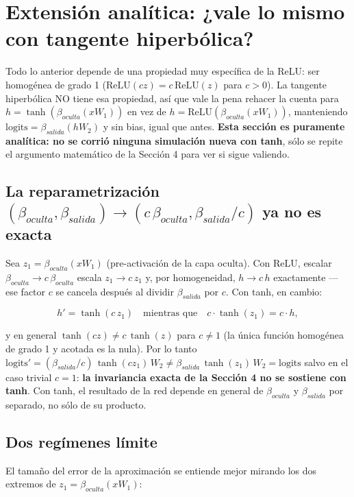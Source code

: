 \documentclass[11pt]{article}
\begin{document}
\section{Extensión analítica: ¿vale lo mismo con tangente hiperbólica?}

Todo lo anterior depende de una propiedad muy específica de la ReLU: ser homogénea de grado 1 ($\mathrm{ReLU}(cz)=c\,\mathrm{ReLU}(z)$ para $c>0$). La tangente hiperbólica NO tiene esa propiedad, así que vale la pena rehacer la cuenta para $h=\tanh(\beta_{oculta}(xW_1))$ en vez de $h=\mathrm{ReLU}(\beta_{oculta}(xW_1))$, manteniendo $\mathrm{logits}=\beta_{salida}(hW_2)$ y sin bias, igual que antes. \textbf{Esta sección es puramente analítica: no se corrió ninguna simulación nueva con tanh}, sólo se repite el argumento matemático de la Sección 4 para ver si sigue valiendo.

\subsection{La reparametrización $(\beta_{oculta},\beta_{salida})\to(c\,\beta_{oculta},\beta_{salida}/c)$ ya no es exacta}

Sea $z_1=\beta_{oculta}(xW_1)$ (pre-activación de la capa oculta). Con ReLU, escalar $\beta_{oculta}\to c\,\beta_{oculta}$ escala $z_1\to c\,z_1$ y, por homogeneidad, $h\to c\,h$ exactamente — ese factor $c$ se cancela después al dividir $\beta_{salida}$ por $c$. Con tanh, en cambio:

$$h' = \tanh(c\,z_1) \quad\text{mientras que}\quad c\cdot\tanh(z_1) = c\cdot h,$$

y en general $\tanh(cz)\neq c\,\tanh(z)$ para $c\neq 1$ (la única función homogénea de grado 1 y acotada es la nula). Por lo tanto $\mathrm{logits}' = (\beta_{salida}/c)\,\tanh(c z_1)\,W_2 \neq \beta_{salida}\,\tanh(z_1)\,W_2 = \mathrm{logits}$ salvo en el caso trivial $c=1$: \textbf{la invariancia exacta de la Sección 4 no se sostiene con tanh}. Con tanh, el resultado de la red depende en general de $\beta_{oculta}$ y $\beta_{salida}$ por separado, no sólo de su producto.

\subsection{Dos regímenes límite}

El tamaño del error de la aproximación se entiende mejor mirando los dos extremos de $z_1=\beta_{oculta}(xW_1)$:
\end{document}

